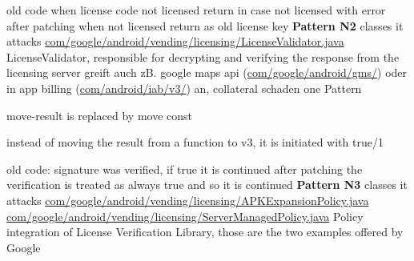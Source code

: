 
old code when license code not licensed return in case not licensed with error
after patching when not licensed return as old license key
\newline
\newline
\textbf{Pattern N2}\newline
classes it attacks
\url{com/google/android/vending/licensing/LicenseValidator.java}
LicenseValidator, responsible for decrypting and verifying the response from the licensing server\cite{developersLicensingReference}
greift auch zB. google maps api (\url{com/google/android/gms/}) oder in app billing (\url{com/android/iab/v3/}) an, collateral schaden
one Pattern



move-result is replaced by move const



instead of moving the result from a function to v3, it is initiated with true/1



old code: signature was verified, if true it is continued
after patching the verification is treated as always true and so it is continued
\newline
\newline
\textbf{Pattern N3}\newline
classes it attacks
\url{com/google/android/vending/licensing/APKExpansionPolicy.java}
\url{com/google/android/vending/licensing/ServerManagedPolicy.java}
Policy integration of License Verification Library, those are the two examples offered by Google\cite{developersLicensingReference}

